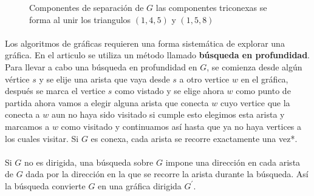\begin{figure}[H]
\begin{subfigure}[b]{0.5\textwidth}
\begin{minipage}{7cm}
\begin{tikzpicture}[scale=.4]
            \end{tikzpicture}
       \end{minipage}
      \end{subfigure}
      \begin{subfigure}[b]{0.5\textwidth}
       \begin{minipage}{7cm}
            \centering%
       \end{minipage}
      \end{subfigure}
\caption{Componentes de separación de $G$ las componentes triconexas se forma al unir los triangulos $(1, 4, 5)$ y $(1, 5, 8)$}
\label{figura:3.2}
\end{figure}

\paragraph{}
Los algoritmos de gráficas requieren una forma sistemática de explorar una gráfica. En el articulo \citep{hopcroft1973} se utiliza un método llamado \textbf{búsqueda en profundidad}. Para llevar a cabo una búsqueda en profundidad en $G$, se comienza desde algún vértice $s$ y se elije una arista que vaya desde $s$ a otro vertice $w$ en el gráfica, después se marca el vertice $s$ como vistado y se elige ahora $w$ como punto de partida ahora vamos a elegir alguna arista que conecta $w$ cuyo vertice que la conecta a $w$ aun no haya sido visitado si cumple esto elegimos esta arista y marcamos a $w$ como visitado y continuamos así hasta que ya no haya vertices a los cuales visitar. Si $G$ es conexa, cada arista se recorre exactamente una vez*.

\paragraph{}
Si $G$ no es dirigida, una búsqueda sobre $G$ impone una dirección en cada arista de $G$ dada por la dirección en la que se recorre la arista durante la búsqueda. Así la búsqueda convierte $G$ en una gráfica dirigida $G^{'}$.

